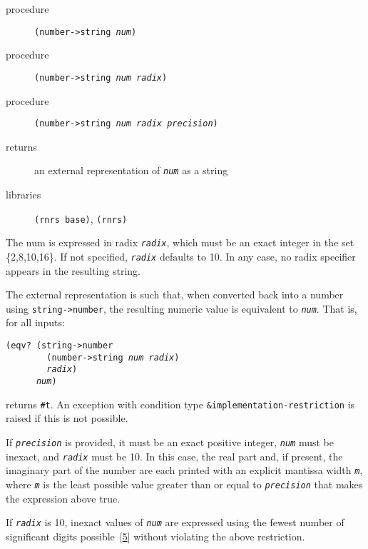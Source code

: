 \begin{description}

\label{objects_s148}\item[procedure] \texttt{(number-\textgreater{}string \textit{num})}



\item[procedure] \texttt{(number-\textgreater{}string \textit{num} \textit{radix})}



\item[procedure] \texttt{(number-\textgreater{}string \textit{num} \textit{radix} \textit{precision})}



\item[returns] an external representation of \texttt{\textit{num}} as a string


\item[libraries] \texttt{(rnrs base)}, \texttt{(rnrs)}
\end{description}


The num is expressed in radix \texttt{\textit{radix}}, which must be an
exact integer in the set \{2,8,10,16\}.
If not specified, \texttt{\textit{radix}} defaults to 10.
In any case, no radix specifier appears in the resulting string.


The external representation is such that, when converted back into
a number using \texttt{string-\textgreater{}number}, the resulting numeric value is equivalent
to \texttt{\textit{num}}.
That is, for all inputs:


\begin{alltt}
(eqv? (string-\textgreater{}number
        (number-\textgreater{}string \textit{num} \textit{radix})
        \textit{radix})
      \textit{num})
\end{alltt}


returns \texttt{\#{}t}.
An exception with condition type
\texttt{\&{}implementation-restriction} is raised if this
is not possible.


If \texttt{\textit{precision}} is provided, it must be an exact positive integer,
\texttt{\textit{num}} must be inexact, and \texttt{\textit{radix}} must be 10.
In this case, the real part and, if present, the imaginary part of
the number are each printed with an explicit mantissa width \texttt{\textit{m}}, where
\texttt{\textit{m}} is the least possible value greater than or equal to
\texttt{\textit{precision}} that makes the expression above true.


If \texttt{\textit{radix}} is 10, inexact values of \texttt{\textit{num}} are expressed using the
fewest number of significant digits possible [\hyperref[bibliography_g223]{5}]
without violating the above restriction.


